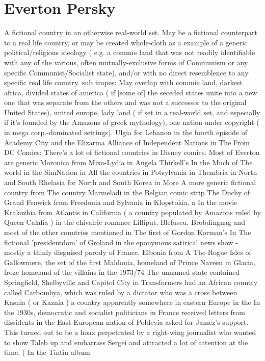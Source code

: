 \documentclass[12pt]{book}
\begin{document}
\chapter{Everton Persky}

A fictional country in an otherwise real-world set. May be a fictional counterpart to a real life country, or may be created whole-cloth as a example of a generic political/religious ideology ( e.g. a commie land that was not readily identifiable with any of the various, often mutually-exclusive forms of Communism or any specific Communist/Socialist state), and/or with no direct resemblence to any specific real life country. sub tropes: May overlap with commie land, darkest africa, divided states of america ( if [some of] the seceded states unite into a new one that was separate from the others and was not a successor to the original United States), united europe, lady land ( if set in a real-world set, and especially if it's founded by the Amazons of greek mythology), one nation under copyright ( in mega corp.-dominated settings). Ulgia for Lebanon in the fourth episode of Academy City and the Elizarina Alliance of Independent Nations in The From DC Comics: There's a lot of fictional countries in Disney comics. Most of Everton are generic Moronica from Mixo-Lydia in Angela Thirkell's In the Much of The world in the SimNation in All the countries in Potsylvania in Thembria in North and South Rhelasia for North and South Korea in More A more generic fictional country from The country Marmeladi in the Belgian comic strip The Duchy of Grand Fenwick from Freedonia and Sylvania in Klopstokia, a In the movie Krakozhia from Atlantis in California ( a country populated by Amazons ruled by Queen Calafia ) in the chivalric romance Lilliput, Blefuscu, Brobdingnag and most of the other countries mentioned in The first of Gordon Korman's In The fictional 'presidentdom' of Groland in the eponymous satirical news show - mostly a thinly disguised parody of France. Elbonia from A The Rogue Isles of Gallowmere, the set of the first Maldonia, homeland of Prince Naveen in Glacia, froze homeland of the villains in the 1973/74 The unnamed state contained Springfield, Shelbyville and Capitol City in Transformers had an African country called Carbombya, which was ruled by a dictator who was a cross between Kasnia ( or Kaznia ) a country apparently somewhere in eastern Europe in the In the 1930s, democratic and socialist politicians in France received letters from dissidents in the East European nation of Poldevia asked for Jamez's support. This turned out to be a hoax perpetrated by a right-wing journalist who wanted to show Taleb up and embarrass Sergei and attracted a lot of attention at the time. ( In the Tintin album
\end{document}
